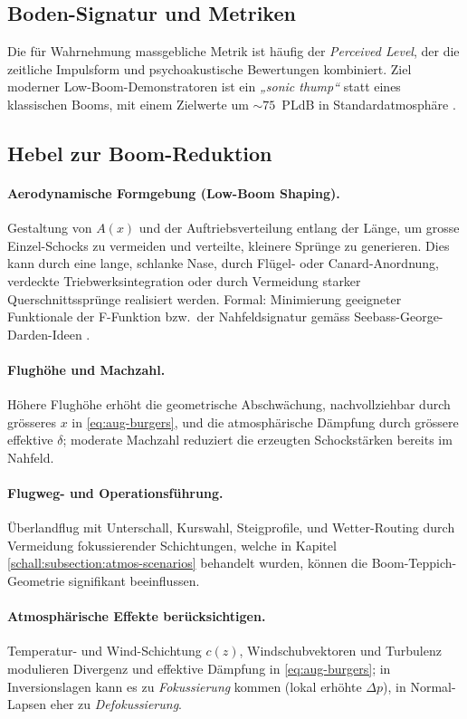 \subsection{Boden-Signatur und Metriken}
Die für Wahrnehmung massgebliche Metrik ist häufig der \emph{Perceived Level},
der die zeitliche Impulsform und psychoakustische Bewertungen kombiniert.
Ziel moderner Low-Boom-Demonstratoren ist ein \emph{„sonic thump“} statt
eines klassischen Booms, mit einem Zielwerte um
${\sim}75$\ PLdB in Standardatmosphäre \cite{schall:x59pldb}.

\subsection{Hebel zur Boom-Reduktion}
\paragraph{Aerodynamische Formgebung (Low-Boom Shaping).}
Gestaltung von $A(x)$ und der Auftriebsverteilung entlang der Länge,
um grosse Einzel-Schocks zu vermeiden und verteilte, kleinere Sprünge zu generieren.
Dies kann durch eine lange, schlanke Nase, durch Flügel- oder Canard-Anordnung,
verdeckte Triebwerksintegration oder durch Vermeidung starker
Querschnittssprünge realisiert werden.
Formal: Minimierung geeigneter Funktionale der F-Funktion bzw.\ der Nahfeldsignatur
gemäss Seebass-George-Darden-Ideen \cite{schall:seebassgeorge,schall:darden75}.

\paragraph{Flughöhe und Machzahl.}
Höhere Flughöhe erhöht die geometrische Abschwächung, nachvollziehbar durch
grösseres $x$ in \eqref{eq:aug-burgers}, und die atmosphärische Dämpfung durch
grössere effektive $\delta$; moderate Machzahl reduziert die erzeugten
Schockstärken bereits im Nahfeld.

\paragraph{Flugweg- und Operationsführung.}
Überlandflug mit Unterschall, Kurswahl, Steigprofile, und Wetter-Routing
durch Vermeidung fokussierender Schichtungen, welche in Kapitel
\ref{schall:subsection:atmos-scenarios} behandelt wurden, können die
Boom-Teppich-Geometrie signifikant beeinflussen.

\paragraph{Atmosphärische Effekte berücksichtigen.}
Temperatur- und Wind-Schichtung $c(z)$, Windschubvektoren und Turbulenz
modulieren Divergenz und effektive Dämpfung in \eqref{eq:aug-burgers};
in Inversionslagen kann es zu \emph{Fokussierung} kommen (lokal erhöhte
$\Delta p$), in Normal-Lapsen eher zu \emph{Defokussierung}.